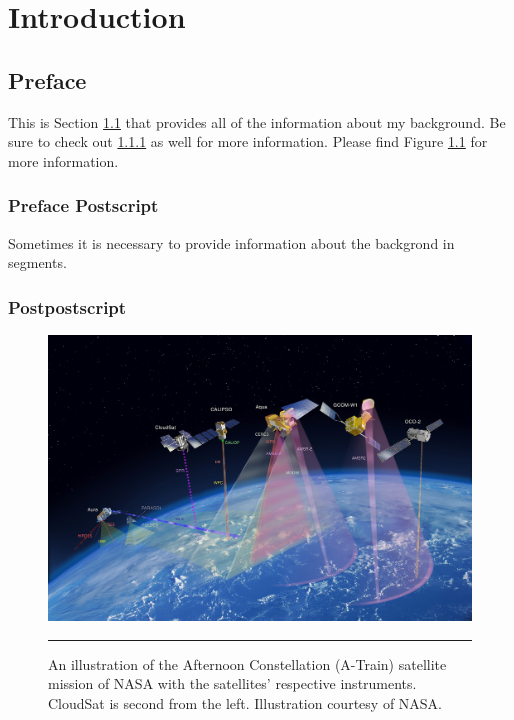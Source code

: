
\chapter{Introduction} %

\label{Chapter1} %



\section{Preface}\label{section:preface}
This is Section \ref{section:preface} that provides all of the information about my background. Be sure to check out \ref{subsection:postscript} as well for more information. Please find Figure \ref{atrain} for more information.

\subsection{Preface Postscript}\label{subsection:postscript}
Sometimes it is necessary to provide information about the backgrond in segments.

\subsection{Postpostscript}

\begin{figure}[h]
\centering
	\includegraphics[width=0.6\linewidth]{Figures/atrain.jpeg}
	\rule{35em}{0.5pt}
	\caption[Afternoon Constellation illustration]{An illustration of the Afternoon Constellation (A-Train) satellite mission of NASA with the satellites' respective instruments. CloudSat is second from the left. Illustration courtesy of NASA.}\label{atrain}
\end{figure}

